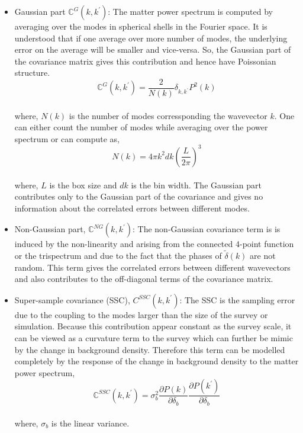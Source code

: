 \begin{itemize}
	\item Gaussian part $\mathbb{C}^{G}(k,k^{\prime})$: The matter power spectrum is computed
			by averaging over the modes in spherical shells in the Fourier space. It 
			is understood that if one average over more number of modes, the underlying
			error on the average will be smaller and vice-versa. So, the Gaussian part
			of the covariance matrix gives this contribution and hence have Poissonian
			structure. 
			\begin{equation}
				\mathbb{C}^{G}(k,k^{\prime}) = \dfrac{2}{N(k)} \delta_{k,k^{\prime}} P^2(k)
			\end{equation}
			\\
			where, $N(k)$ is the number of modes corressponding the wavevector $k$. One 
			can either count the number of modes while averaging over the power spectrum
			or can compute as,
			\begin{equation}
				N(k) = 4 \pi k^2 dk \left( \dfrac{L}{2\pi} \right)^3
			\end{equation}
			\\
			where, $L$ is the box size and $dk$ is the bin width. The Gaussian part 
			contributes only to the Gaussian part of the covariance and gives no 
			information about the correlated errors between different modes. 

	\item Non-Gaussian part, $\mathbb{C}^{NG}(k,k^{\prime})$: The non-Gaussian covariance term is 
			is induced by the non-linearity and arising from the connected 4-point function or the trispectrum and due to the fact that the phases of $\tilde{\delta}(k)$ are 
			not random. This term gives the correlated errors between
			different wavevectors and also contributes to the off-diagonal terms
			of the covariance matrix. 

	\item Super-sample covariance (SSC), $C^{SSC}(k,k^{\prime})$: The SSC is the sampling
			error due to the coupling to the modes larger than the size of the survey or
			simulation. Because this contribution appear constant as the survey scale, it 
			can be viewed as a curvature term to the survey which can further be mimic
			by the change in background density. Therefore this term can be modelled
			completely by the response of the change in background density to the
			matter power spectrum,
			\begin{equation}
				\mathbb{C}^{SSC}(k,k^{\prime}) = \sigma_b^2 \dfrac{\partial P(k)}{\partial \delta_b}
										\dfrac{\partial P(k^{\prime})}{\partial \delta_b}
			\end{equation}
			\\
			where, $\sigma_b$ is the linear variance. 
\end{itemize}

